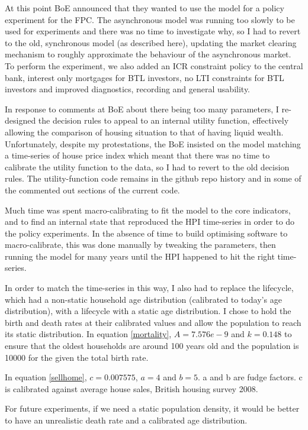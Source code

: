 \documentclass{report}
\begin{document}
At this point BoE announced that they wanted to use the model for a policy experiment for the FPC. The asynchronous model was running too slowly to be used for experiments and there was no time to investigate why, so I had to revert to the old, synchronous model (as described here), updating the market clearing mechanism to roughly approximate the behaviour of the asynchronous market. To perform the experiment, we also added an ICR constraint policy to the central bank, interest only mortgages for BTL investors, no LTI constraints for BTL investors and improved diagnostics, recording and general usability.

In response to comments at BoE about there being too many parameters, I re-designed the decision rules to appeal to an internal utility function, effectively allowing the comparison of housing situation to that of having liquid wealth. Unfortunately, despite my protestations, the BoE insisted on the model matching a time-series of house price index which meant that there was no time to calibrate the utility function to the data, so I had to revert to the old decision rules. The utility-function code remains in the github repo history and in some of the commented out sections of the current code.

Much time was spent macro-calibrating to fit the model to the core indicators, and to find an internal state that reproduced the HPI time-series in order to do the policy experiments. In the absence of time to build optimising software to macro-calibrate, this was done manually by tweaking the parameters, then running the model for many years until the HPI happened to hit the right time-series.

In order to match the time-series in this way, I also had to replace the lifecycle, which had a non-static household age distribution (calibrated to today's age distribution), with a lifecycle with a static age distribution. I chose to hold the birth and death rates at their calibrated values and allow the population to reach its static distribution. In equation \ref{mortality}, $A=7.576e-9$ and $k=0.148$ to ensure that the oldest households are around 100 years old and the population is 10000 for the given the total birth rate.

In equation \ref{sellhome}, $c=0.007575$, $a=4$ and $b=5$. a and b are fudge factors. c is calibrated against average house sales, British housing survey 2008.

For future experiments, if we need a static population density, it would be better to have an unrealistic death rate and a calibrated age distribution.
\end{document}
